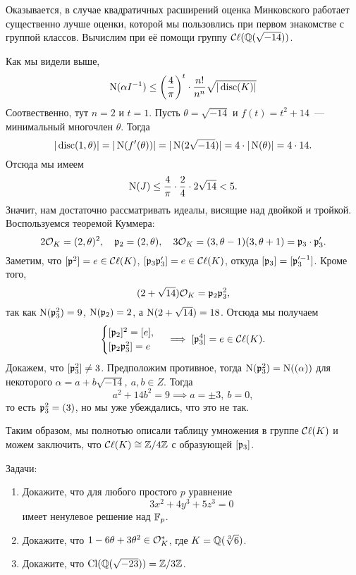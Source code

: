  	  \begin{example}
 	  	Оказывается, в случае квадратичных расширений оценка Минковского работает существенно лучше оценки, которой мы пользовлись при первом знакомстве с группой классов. Вычислим при её помощи группу $\Class(\Q(\sqrt{-14}))$. 

 	  	Как мы видели выше, 
 	  	\[
 	  		\Nm(\alpha I^{-1}) \le \lr*{\frac{4}{\pi}}^{t} \cdot \frac{n!}{n^n} \sqrt{|\disc(K)|}
 	  	\]
 	  	Соотвественно, тут $n = 2$ и $t = 1$. Пусть $\theta = \sqrt{-14}$ и $f(t) = t^2 + 14$~--- минимальный многочлен $\theta$. Тогда 
 	  	\[
 	  		|\disc(1, \theta)| = |\Nm(f'(\theta))| = |\Nm(2\sqrt{-14})| = 4 \cdot |\Nm(\theta)| = 4 \cdot 14.
 	  	\]
 	  	Отсюда мы имеем
 	  	\[
 	  		\Nm(J) \le \frac{4}{\pi} \cdot \frac{2}{4} \cdot 2\sqrt{14} < 5.
 	  	\]
 	  	Значит, нам достаточно рассматривать идеалы, висящие над  двойкой и тройкой. Воспользуемся теоремой Куммера: 
 	  	\[
 	  		2\cO_{K} = (2, \theta)^2, \quad \fp_2 = (2, \theta), \quad 3\cO_{K} = (3, \theta - 1)(3, \theta + 1) = \fp_3 \cdot \fp_{3}'.
 	  	\]
 	  	Заметим, что $[\fp^2] = e \in \Class(K)$, $[\fp_3 \fp_3'] = e \in \Class(K)$, откуда $[\fp_3] = [\fp_3'^{-1}]$. Кроме того, 
 	  	\[
 	  		(2 + \sqrt{14})\cO_{K} = \fp_2 \fp_3^2,
 	  	\]
 	  	так как $\Nm(\fp_3^2) = 9$, $\Nm(\fp_2) = 2$, а $\Nm(2 + \sqrt{14}) = 18$. Отсюда мы получаем
 	  	\[
 	  		\begin{cases} [\fp_2]^2 = [e], \\  [\fp_2 \fp_3^2] = e \end{cases} \implies [\fp_3^4] = e \in \Class(K). 
 	  	\]
 	  	Докажем, что $[\fp_3^2] \neq 3$. Предположим противное, тогда $\Nm(\fp_3^2) = \Nm((\alpha))$ для некоторого $\alpha = a + b\sqrt{-14}, \ a, b \in Z$. Тогда 
 	  	\[
 	  		a^2 + 14b^2 = 9  \implies a = \pm 3, \ b = 0,
 	  	\]
 	  	то есть $\fp_3^2 = (3)$, но мы уже убеждались, что это не так. 

 	  	Таким образом, мы полнотью описали таблицу умножения в группе $\Class(K)$ и можем заключить, что $\Class(K) \cong \Z/4\Z$ с образующей $[\fp_3]$.
 	  	
 	  \end{example}

 	  \begin{homework}\label{hw:10}
 	  	Задачи: 
 	  	\begin{enumerate}
 	  		\item Докажите, что для любого простого $p$ уравнение  
 	  		\[
 	  			3x^2 + 4y^3 + 5z^3 = 0
 	  		\]
 	  		имеет ненулевое решение над $\F_{p}$.
 	  		\item Докажите, что $1 - 6\theta + 3\theta^2 \in \cO_{K}^{*}$, где $K = \Q(\sqrt[3]{6})$.

 	  		\item Докажите, что $\Cl(\Q(\sqrt{-23})) = \Z/3\Z$.
 	  	\end{enumerate}
 	  \end{homework}












